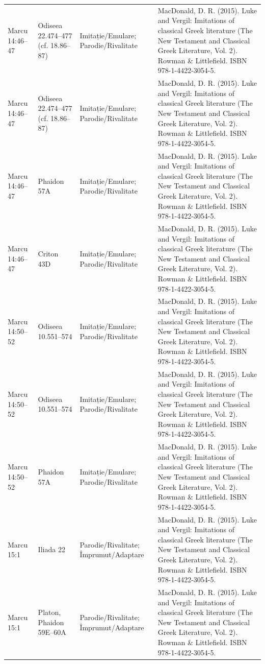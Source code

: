 \documentclass[12pt,a4paper,twoside,openany]{book}
\begin{document}
\begin{longtable}{L{1.4cm}L{1.7cm}L{3.1cm}L{8.4cm}}
Marcu 14:46–47 & Odiseea 22.474–477 (cf. 18.86–87) & Imitație/Emulare; Parodie/Rivalitate & MacDonald, D. R. (2015). Luke and Vergil: Imitations of classical Greek literature (The New Testament and Classical Greek Literature, Vol. 2). Rowman \& Littlefield. ISBN 978-1-4422-3054-5. \\
Marcu 14:46–47 & Odiseea 22.474–477 (cf. 18.86–87) & Imitație/Emulare; Parodie/Rivalitate & MacDonald, D. R. (2015). Luke and Vergil: Imitations of classical Greek literature (The New Testament and Classical Greek Literature, Vol. 2). Rowman \& Littlefield. ISBN 978-1-4422-3054-5. \\
Marcu 14:46–47 & Phaidon 57A & Imitație/Emulare; Parodie/Rivalitate & MacDonald, D. R. (2015). Luke and Vergil: Imitations of classical Greek literature (The New Testament and Classical Greek Literature, Vol. 2). Rowman \& Littlefield. ISBN 978-1-4422-3054-5. \\
Marcu 14:46–47 & Criton 43D & Imitație/Emulare; Parodie/Rivalitate & MacDonald, D. R. (2015). Luke and Vergil: Imitations of classical Greek literature (The New Testament and Classical Greek Literature, Vol. 2). Rowman \& Littlefield. ISBN 978-1-4422-3054-5. \\
Marcu 14:50–52 & Odiseea 10.551–574 & Imitație/Emulare; Parodie/Rivalitate & MacDonald, D. R. (2015). Luke and Vergil: Imitations of classical Greek literature (The New Testament and Classical Greek Literature, Vol. 2). Rowman \& Littlefield. ISBN 978-1-4422-3054-5. \\
Marcu 14:50–52 & Odiseea 10.551–574 & Imitație/Emulare; Parodie/Rivalitate & MacDonald, D. R. (2015). Luke and Vergil: Imitations of classical Greek literature (The New Testament and Classical Greek Literature, Vol. 2). Rowman \& Littlefield. ISBN 978-1-4422-3054-5. \\
Marcu 14:50–52 & Phaidon 57A & Imitație/Emulare; Parodie/Rivalitate & MacDonald, D. R. (2015). Luke and Vergil: Imitations of classical Greek literature (The New Testament and Classical Greek Literature, Vol. 2). Rowman \& Littlefield. ISBN 978-1-4422-3054-5. \\
Marcu 15:1 & Iliada 22 & Parodie/Rivalitate; Împrumut/Adaptare & MacDonald, D. R. (2015). Luke and Vergil: Imitations of classical Greek literature (The New Testament and Classical Greek Literature, Vol. 2). Rowman \& Littlefield. ISBN 978-1-4422-3054-5. \\
Marcu 15:1 & Platon, Phaidon 59E–60A & Parodie/Rivalitate; Împrumut/Adaptare & MacDonald, D. R. (2015). Luke and Vergil: Imitations of classical Greek literature (The New Testament and Classical Greek Literature, Vol. 2). Rowman \& Littlefield. ISBN 978-1-4422-3054-5. \\

\end{longtable}
\end{document}
